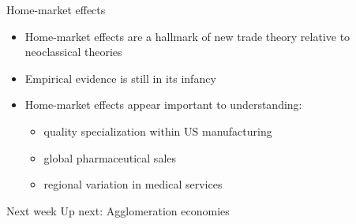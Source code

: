 \documentclass[11pt,notes=hide,aspectratio=169]{beamer}
\begin{document}
\begin{frame}{Home-market effects}
\begin{itemize}
	\item Home-market effects are a hallmark of new trade theory relative to neoclassical theories
	\item Empirical evidence is still in its infancy
	\item Home-market effects appear important to understanding:
	\begin{itemize}
		\item quality specialization within US manufacturing
		\item global pharmaceutical sales
		\item regional variation in medical services
	\end{itemize}
\end{itemize}
\end{frame}
\begin{frame}{Next week}
Up next: Agglomeration economies
\end{frame}
\end{document}
